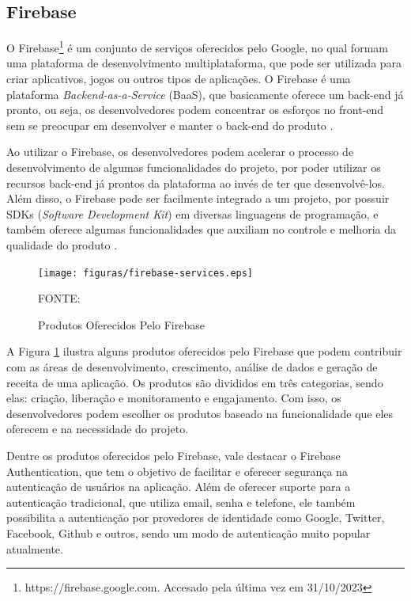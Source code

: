\subsection{Firebase}

O Firebase\footnote{https://firebase.google.com. Accesado pela última vez em 31/10/2023} é um conjunto de serviços 
oferecidos pelo Google, no qual formam uma plataforma de desenvolvimento 
multiplataforma, que pode ser utilizada para criar aplicativos, jogos ou outros tipos de aplicações. 
O Firebase é uma plataforma \textit{Backend-as-a-Service} (BaaS), que basicamente 
oferece um back-end já pronto, ou seja, os desenvolvedores podem concentrar os esforços no front-end sem 
se preocupar em desenvolver e manter o back-end do produto \cite{AluraFirebase}.

Ao utilizar o Firebase, os desenvolvedores podem acelerar o processo de desenvolvimento de algumas
funcionalidades do projeto, por poder utilizar os recursos back-end já prontos da plataforma ao invés
de ter que desenvolvê-los. Além disso, o Firebase pode ser facilmente integrado a um projeto, por possuir 
SDKs (\textit{Software Development Kit}) em diversas linguagens de programação, e também oferece algumas funcionalidades que auxiliam no 
controle e melhoria da qualidade do produto \cite{AluraFirebase}.

\begin{figure}[h]
	\centering
	\caption{Produtos Oferecidos Pelo Firebase}
	\texttt{[image: figuras/firebase-services.eps]}
    \parbox{\linewidth}{\centering FONTE: \cite{RocketseatFirebase}}
	\label{fig-firebase-services}
\end{figure}

A Figura \ref{fig-firebase-services} ilustra alguns produtos oferecidos pelo Firebase que podem contribuir com as áreas de desenvolvimento, 
crescimento, análise de dados e geração de receita de uma aplicação. Os produtos são divididos em três categorias, 
sendo elas: criação, liberação e monitoramento e engajamento. Com isso, os desenvolvedores podem escolher os produtos baseado na 
funcionalidade que eles oferecem e na necessidade do projeto.

Dentre os produtos oferecidos pelo Firebase, vale destacar o Firebase Authentication, que tem o objetivo de facilitar e oferecer 
segurança na autenticação de usuários na aplicação. Além de oferecer suporte para a autenticação tradicional, que utiliza email, 
senha e telefone, ele também possibilita a autenticação por provedores de identidade como Google, Twitter, 
Facebook, Github e outros, sendo um modo de autenticação muito popular atualmente.


